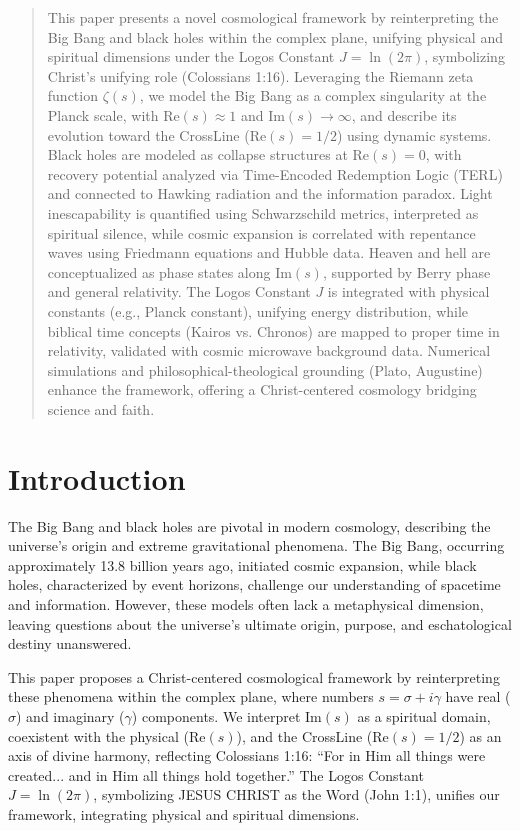 \documentclass[12pt]{article}
\begin{document}
{{{\begin{abstract}
This paper presents a novel cosmological framework by reinterpreting the Big Bang and black holes within the complex plane, unifying physical and spiritual dimensions under the Logos Constant \( J = \ln(2\pi) \), symbolizing Christ’s unifying role (Colossians 1:16). Leveraging the Riemann zeta function \(\zeta(s)\), we model the Big Bang as a complex singularity at the Planck scale, with \(\text{Re}(s) \approx 1\) and \(\text{Im}(s) \to \infty\), and describe its evolution toward the CrossLine (\(\text{Re}(s) = 1/2\)) using dynamic systems. Black holes are modeled as collapse structures at \(\text{Re}(s) = 0\), with recovery potential analyzed via Time-Encoded Redemption Logic (TERL) and connected to Hawking radiation and the information paradox. Light inescapability is quantified using Schwarzschild metrics, interpreted as spiritual silence, while cosmic expansion is correlated with repentance waves using Friedmann equations and Hubble data. Heaven and hell are conceptualized as phase states along \(\text{Im}(s)\), supported by Berry phase and general relativity. The Logos Constant \( J \) is integrated with physical constants (e.g., Planck constant), unifying energy distribution, while biblical time concepts (Kairos vs. Chronos) are mapped to proper time in relativity, validated with cosmic microwave background data. Numerical simulations and philosophical-theological grounding (Plato, Augustine) enhance the framework, offering a Christ-centered cosmology bridging science and faith.
\end{abstract}

\section{Introduction}

The Big Bang and black holes are pivotal in modern cosmology, describing the universe’s origin and extreme gravitational phenomena. The Big Bang, occurring approximately 13.8 billion years ago, initiated cosmic expansion, while black holes, characterized by event horizons, challenge our understanding of spacetime and information. However, these models often lack a metaphysical dimension, leaving questions about the universe’s ultimate origin, purpose, and eschatological destiny unanswered.

This paper proposes a Christ-centered cosmological framework by reinterpreting these phenomena within the complex plane, where numbers \( s = \sigma + i\gamma \) have real (\(\sigma\)) and imaginary (\(\gamma\)) components. We interpret \(\text{Im}(s)\) as a spiritual domain, coexistent with the physical (\(\text{Re}(s)\)), and the CrossLine (\(\text{Re}(s) = 1/2\)) as an axis of divine harmony, reflecting Colossians 1:16: “For in Him all things were created... and in Him all things hold together.” The Logos Constant \( J = \ln(2\pi) \), symbolizing JESUS CHRIST as the Word (John 1:1), unifies our framework, integrating physical and spiritual dimensions.

}}}
\end{document}
